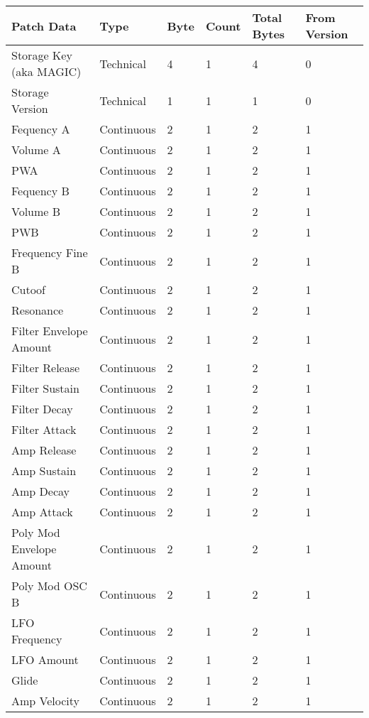 \begin{longtable}[l]{|p{5cm}|p{2cm}|p{1.5cm}|p{1.5cm}|p{1.5cm}|p{1.5cm}|} 
\hline
\textbf{Patch Data} & \textbf{Type} & \textbf{Byte} & \textbf{Count} & \textbf{Total Bytes} & \textbf{From Version} \\ \hline
Storage Key (aka MAGIC) & Technical & 4 & 1 & 4 & 0 \\ \hline
Storage Version & Technical & 1 & 1 & 1 & 0 \\ \hline
Fequency A & Continuous & 2 & 1 & 2 & 1 \\ \hline
Volume A & Continuous & 2 & 1 & 2 & 1 \\ \hline
PWA & Continuous & 2 & 1 & 2 & 1 \\ \hline
Fequency B & Continuous & 2 & 1 & 2 & 1 \\ \hline
Volume B & Continuous & 2 & 1 & 2 & 1 \\ \hline
PWB & Continuous & 2 & 1 & 2 & 1 \\ \hline
Frequency Fine B & Continuous & 2 & 1 & 2 & 1 \\ \hline
Cutoof & Continuous & 2 & 1 & 2 & 1 \\ \hline
Resonance & Continuous & 2 & 1 & 2 & 1 \\ \hline
Filter Envelope Amount & Continuous & 2 & 1 & 2 & 1 \\ \hline
Filter Release & Continuous & 2 & 1 & 2 & 1 \\ \hline
Filter Sustain & Continuous & 2 & 1 & 2 & 1 \\ \hline
Filter Decay & Continuous & 2 & 1 & 2 & 1 \\ \hline
Filter Attack & Continuous & 2 & 1 & 2 & 1 \\ \hline
Amp Release & Continuous & 2 & 1 & 2 & 1 \\ \hline
Amp Sustain & Continuous & 2 & 1 & 2 & 1 \\ \hline
Amp Decay & Continuous & 2 & 1 & 2 & 1 \\ \hline
Amp Attack & Continuous & 2 & 1 & 2 & 1 \\ \hline
Poly Mod Envelope Amount & Continuous & 2 & 1 & 2 & 1 \\ \hline
Poly Mod OSC B & Continuous & 2 & 1 & 2 & 1 \\ \hline
LFO Frequency & Continuous & 2 & 1 & 2 & 1 \\ \hline
LFO Amount & Continuous & 2 & 1 & 2 & 1 \\ \hline
Glide & Continuous & 2 & 1 & 2 & 1 \\ \hline
Amp Velocity & Continuous & 2 & 1 & 2 & 1 \\ \hline

\end{longtable}
